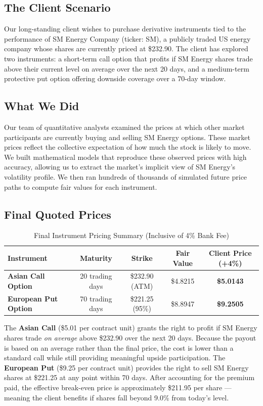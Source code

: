 \documentclass[12pt,a4paper]{article}
\newcommand{\thead}[1]{\cellcolor{headernavy}\color{white}\textbf{#1}}
\newcommand{\rowA}{\rowcolor{white}}
\newcommand{\rowB}{\rowcolor{rowgray}}
\begin{document}
\subsection*{The Client Scenario}

Our long-standing client wishes to purchase derivative instruments tied to the performance of SM Energy Company (ticker: SM), a publicly traded US energy company whose shares are currently priced at \$232.90. The client has explored two instruments: a short-term call option that profits if SM Energy shares trade above their current level on average over the next 20 days, and a medium-term protective put option offering downside coverage over a 70-day window.

\subsection*{What We Did}

Our team of quantitative analysts examined the prices at which other market participants are currently buying and selling SM Energy options. These market prices reflect the collective expectation of how much the stock is likely to move. We built mathematical models that reproduce these observed prices with high accuracy, allowing us to extract the market's implicit view of SM Energy's volatility profile. We then ran hundreds of thousands of simulated future price paths to compute fair values for each instrument.

\subsection*{Final Quoted Prices}

\begin{table}[H]
  \centering
  \caption{Final Instrument Pricing Summary (Inclusive of 4\% Bank Fee)}
  \begin{tabular}{>{\bfseries}lcccc}
    \hline
    \thead{Instrument} & \thead{Maturity} & \thead{Strike} & \thead{Fair Value} & \thead{Client Price (+4\%)} \\
    \hline
    \rowA Asian Call Option   & 20 trading days   & \$232.90 (ATM)  & \$4.8215 & \textbf{\$5.0143} \\
    \rowB European Put Option & 70 trading days   & \$221.25 (95\%) & \$8.8947 & \textbf{\$9.2505} \\
    \hline
  \end{tabular}
\end{table}

The \textbf{Asian Call} (\$5.01 per contract unit) grants the right to profit if SM Energy shares trade \emph{on average} above \$232.90 over the next 20 days. Because the payout is based on an average rather than the final price, the cost is lower than a standard call while still providing meaningful upside participation. The \textbf{European Put} (\$9.25 per contract unit) provides the right to sell SM Energy shares at \$221.25 at any point within 70 days. After accounting for the premium paid, the effective break-even price is approximately \$211.95 per share --- meaning the client benefits if shares fall beyond 9.0\% from today's level.
\end{document}
